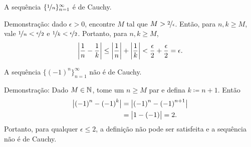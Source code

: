 \begin{example}
A sequência $\{ \nicefrac{1}{n} \}_{n=1}^\infty$ é de Cauchy.

Demonstração: dado $\epsilon > 0$, encontre $M$ tal que
$M > \nicefrac{2}{\epsilon}$. Então, para $n,k \geq M$,
vale $\nicefrac{1}{n} < \nicefrac{\epsilon}{2}$
e
$\nicefrac{1}{k} < \nicefrac{\epsilon}{2}$. Portanto, para $n, k \geq M$,
\begin{equation*}
\left\lvert {\frac{1}{n} - \frac{1}{k}} \right\rvert
\leq
\left\lvert {\frac{1}{n}} \right\rvert + \left\lvert {\frac{1}{k}} \right\rvert
< \frac{\epsilon}{2} + \frac{\epsilon}{2} = \epsilon.
\end{equation*}
\end{example}

\begin{example}
A sequência $\bigl\{ {(-1)}^n \bigr\}_{n=1}^\infty$ não é de Cauchy.

Demonstração:
Dado $M \in {\mathbb{N}}$, tome um $n \geq M$ par
e defina $k \coloneqq n+1$. Então
\begin{equation*}
\begin{split}
\bigl\lvert {{(-1)}^n - {(-1)}^k} \bigr\rvert
& =
\bigl\lvert {{(-1)}^n - {(-1)}^{n+1}} \bigr\rvert
\\
& =
\bigl\lvert {1 - (-1)} \bigr\rvert = 2 .
\end{split}
\end{equation*}
Portanto, para qualquer $\epsilon \leq 2$, a definição não pode ser satisfeita e
a sequência não é de Cauchy.
\end{example}

%

